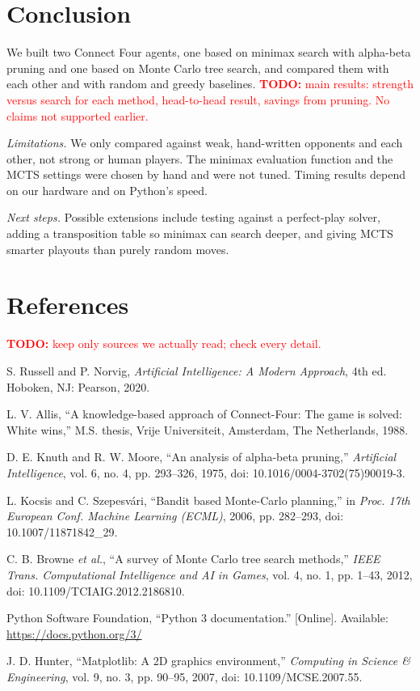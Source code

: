 \documentclass[10pt,twocolumn,letterpaper]{article}
\newcommand{\todo}[1]{\textcolor{red}{\textbf{TODO:} #1}}
\begin{document}
\section{Conclusion}

We built two Connect Four agents, one based on minimax search with alpha-beta pruning and
one based on Monte Carlo tree search, and compared them with each other and with random and
greedy baselines. \todo{main results: strength versus search for each method, head-to-head
result, savings from pruning. No claims not supported earlier.}

\textit{Limitations.} We only compared against weak, hand-written opponents and each other,
not strong or human players. The minimax evaluation function and the MCTS settings were
chosen by hand and were not tuned. Timing results depend on our hardware and on Python's
speed.

\textit{Next steps.} Possible extensions include testing against a perfect-play solver,
adding a transposition table so minimax can search deeper, and giving MCTS smarter playouts
than purely random moves.

\section*{References}
\todo{keep only sources we actually read; check every detail.}
\begin{enumerate}[label={[\arabic*]},leftmargin=*,itemsep=2pt,font=\footnotesize]
\footnotesize
\item S. Russell and P. Norvig, \textit{Artificial Intelligence: A Modern Approach}, 4th ed.
  Hoboken, NJ: Pearson, 2020.
\item L. V. Allis, ``A knowledge-based approach of Connect-Four: The game is solved: White
  wins,'' M.S. thesis, Vrije Universiteit, Amsterdam, The Netherlands, 1988.
\item D. E. Knuth and R. W. Moore, ``An analysis of alpha-beta pruning,'' \textit{Artificial
  Intelligence}, vol. 6, no. 4, pp. 293--326, 1975, doi: 10.1016/0004-3702(75)90019-3.
\item L. Kocsis and C. Szepesv\'ari, ``Bandit based Monte-Carlo planning,'' in \textit{Proc.
  17th European Conf. Machine Learning (ECML)}, 2006, pp. 282--293, doi: 10.1007/11871842\_29.
\item C. B. Browne \textit{et al.}, ``A survey of Monte Carlo tree search methods,''
  \textit{IEEE Trans. Computational Intelligence and AI in Games}, vol. 4, no. 1, pp. 1--43,
  2012, doi: 10.1109/TCIAIG.2012.2186810.
\item Python Software Foundation, ``Python 3 documentation.'' [Online]. Available:
  \url{https://docs.python.org/3/}
\item J. D. Hunter, ``Matplotlib: A 2D graphics environment,'' \textit{Computing in Science
  \& Engineering}, vol. 9, no. 3, pp. 90--95, 2007, doi: 10.1109/MCSE.2007.55.
\end{enumerate}
\end{document}
